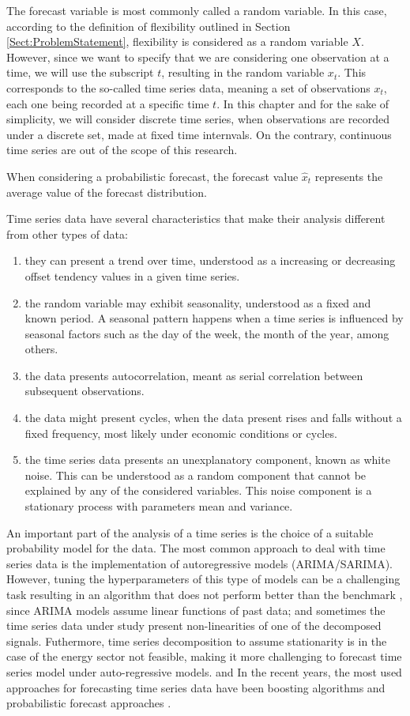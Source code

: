 The forecast variable is most commonly called a random variable. In this case, according to the definition of flexibility outlined in Section \ref{Sect:ProblemStatement}, flexibility is considered as a random variable $X$. However, since we want to specify that we are considering one observation at a time, we will use the subscript $t$, resulting in the random variable $x_t$. This corresponds to the so-called time series data, meaning a set of observations $x_t$, each one being recorded at a specific time $t$. In this chapter and for the sake of simplicity, we will consider discrete time series, when observations are recorded under a discrete set, made at fixed time internvals. On the contrary, continuous time series are out of the scope of this research. 

When considering a probabilistic forecast, the forecast value $\hat{x}_t$ represents the average value of the forecast distribution.

Time series data have several characteristics that make their analysis different from other types of data: 
\begin{enumerate}
\item they can present a trend over time, understood as a increasing or decreasing offset tendency values in a given time series. 
\item the random variable may exhibit seasonality, understood as a fixed and known period. A seasonal pattern happens when a time series is influenced by seasonal factors such as the day of the week, the month of the year, among others. 
\item the data presents autocorrelation, meant as serial correlation between subsequent observations. 
\item the data might present cycles, when the data present rises and falls without a fixed frequency, most likely under economic conditions or cycles. 
\item the time series data presents an unexplanatory component, known as white noise. This can be understood as a random component that cannot be explained by any of the considered variables. This noise component is a stationary process with parameters mean and variance. 
\end{enumerate} 

An important part of the analysis of a time series is the choice of a suitable probability model for the data. The most common approach to deal with time series data is the implementation of autoregressive models (ARIMA/SARIMA). However, tuning the hyperparameters of this type of models can be a challenging task resulting in an algorithm that does not perform better than the benchmark \cite{nonlinearARIMA}, since ARIMA models assume linear functions of past data; and sometimes the time series data under study present non-linearities of one of the decomposed signals. Futhermore, time series decomposition to assume stationarity is in the case of the energy sector not feasible, making it more challenging to forecast time series model under auto-regressive models. and In the recent years, the most used approaches for forecasting time series data have been boosting algorithms and probabilistic forecast approaches \cite{Robinzonov2010, Barrow2016, Taieb2017, Guen2020}.  

